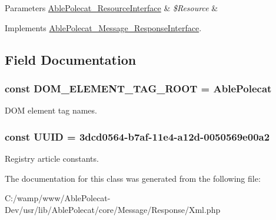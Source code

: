 \begin{DoxyParams}[1]{Parameters}
\hyperlink{interface_able_polecat___resource_interface}{Able\+Polecat\+\_\+\+Resource\+Interface} & {\em \$\+Resource} & \\
\hline
\end{DoxyParams}


Implements \hyperlink{interface_able_polecat___message___response_interface_a858ab2a95af7d312509c203de5c6fb11}{Able\+Polecat\+\_\+\+Message\+\_\+\+Response\+Interface}.



\subsection{Field Documentation}
\hypertarget{class_able_polecat___message___response___xml_ad23b3bef9ea0d362212e78bc8d37d629}{}
\subsubsection[{D\+O\+M\+\_\+\+E\+L\+E\+M\+E\+N\+T\+\_\+\+T\+A\+G\+\_\+\+R\+O\+O\+T}]{\setlength{\rightskip}{0pt plus 5cm}const D\+O\+M\+\_\+\+E\+L\+E\+M\+E\+N\+T\+\_\+\+T\+A\+G\+\_\+\+R\+O\+O\+T = \textquotesingle{}Able\+Polecat\textquotesingle{}}\label{class_able_polecat___message___response___xml_ad23b3bef9ea0d362212e78bc8d37d629}
D\+O\+M element tag names. \hypertarget{class_able_polecat___message___response___xml_a74b892c8c0b86bf9d04c5819898c51e7}{}
\subsubsection[{U\+U\+I\+D}]{\setlength{\rightskip}{0pt plus 5cm}const U\+U\+I\+D = \textquotesingle{}3dcd0564-\/b7af-\/11e4-\/a12d-\/0050569e00a2\textquotesingle{}}\label{class_able_polecat___message___response___xml_a74b892c8c0b86bf9d04c5819898c51e7}
Registry article constants. 

The documentation for this class was generated from the following file\+:\begin{DoxyCompactItemize}
\item 
C\+:/wamp/www/\+Able\+Polecat-\/\+Dev/usr/lib/\+Able\+Polecat/core/\+Message/\+Response/Xml.\+php\end{DoxyCompactItemize}
